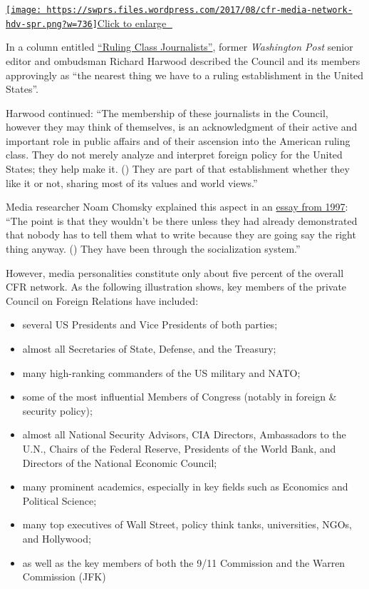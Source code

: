 \href{https://swprs.files.wordpress.com/2017/08/cfr-media-network-hdv-spr.png}{\texttt{[image: https://swprs.files.wordpress.com/2017/08/cfr-media-network-hdv-spr.png?w=736]}}\href{https://swprs.files.wordpress.com/2017/08/cfr-media-network-hdv-spr.png}{Click
to enlarge 🔎}

In a column entitled
\href{https://www.washingtonpost.com/archive/opinions/1993/10/30/ruling-class-journalists/761e7bf8-025d-474e-81cb-92dcf271571e/}{``Ruling
Class Journalists''}, former \emph{Washington Post} senior editor and
ombudsman Richard Harwood described the Council and its members
approvingly as ``the nearest thing we have to a ruling establishment in
the United States''.

Harwood continued: ``The membership of these journalists in the Council,
however they may think of themselves, is an acknowledgment of their
active and important role in public affairs and of their ascension into
the American ruling class. They do not merely analyze and interpret
foreign policy for the United States; they help make it. () They are
part of that establishment whether they like it or not, sharing most of
its values and world views.''

Media researcher Noam Chomsky explained this aspect in an
\href{https://chomsky.info/199710__/}{essay from 1997}: ``The point is
that they wouldn't be there unless they had already demonstrated that
nobody has to tell them what to write because they are going say the
right thing anyway. () They have been through the socialization
system.''

However, media personalities constitute only about five percent of the
overall CFR network. As the following illustration shows, key members of
the private Council on Foreign Relations have included:

\begin{itemize}
\tightlist
\item
  several US Presidents and Vice Presidents of both parties;
\item
  almost all Secretaries of State, Defense, and the Treasury;
\item
  many high-ranking commanders of the US military and NATO;
\item
  some of the most influential Members of Congress (notably in foreign
  \& security policy);
\item
  almost all National Security Advisors, CIA Directors, Ambassadors to
  the U.N., Chairs of the Federal Reserve, Presidents of the World Bank,
  and Directors of the National Economic Council;
\item
  many prominent academics, especially in key fields such as Economics
  and Political Science;
\item
  many top executives of Wall Street, policy think tanks, universities,
  NGOs, and Hollywood;
\item
  as well as the key members of both the 9/11 Commission and the Warren
  Commission (JFK)
\end{itemize}

